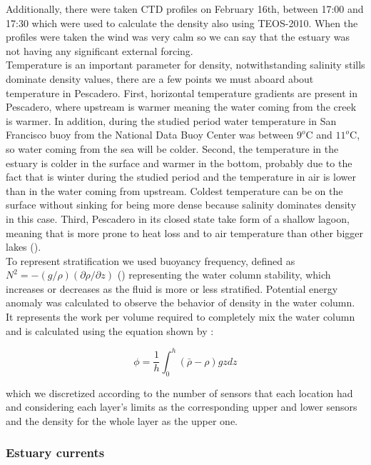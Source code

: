 \documentclass[11pt,letterpaper]{article}
\begin{document}
Additionally, there were taken CTD profiles on February 16th, between 17:00 and 17:30 which were used to calculate the density also using TEOS-2010. When the profiles were taken the wind was very calm so we can say that the estuary was not having any significant external forcing. \\

Temperature is an important parameter for density, notwithstanding salinity stills dominate density values, there are a few points we must aboard about temperature in Pescadero. First, horizontal temperature gradients are present in Pescadero, where upstream is warmer meaning the water coming from the creek is warmer. In addition, during the studied period water temperature in San Francisco buoy from the National Data Buoy Center was between $9^o$C and $11^o$C, so water coming from the sea will be colder. Second, the temperature in the estuary is colder in the surface and warmer in the bottom, probably due to the fact that is winter during the studied period and the temperature in air is lower than in the water coming from upstream. Coldest temperature can be on the surface without sinking for being more dense because salinity dominates density in this case. Third, Pescadero in its closed state take form of a shallow lagoon, meaning that is more prone to heat loss and to air temperature than other bigger lakes (\cite{peeters2009currents}).\\

To represent stratification we used buoyancy frequency, defined as $N^2 = -(g/\rho)(\partial \rho/\partial z)$ (\cite{kundu2002fluid}) representing the water column stability, which increases or decreases as the fluid is more or less stratified. Potential energy anomaly was calculated to observe the behavior of density in the water column. It represents the work per volume required to completely mix the water column and is calculated using the equation shown by \citeauthor{simpson1990tidal}: 

\begin{equation}
    \phi=\frac{1}{h}\int^h_0(\bar{\rho}-\rho)gzdz
    \label{eq: phi}
\end{equation}

which we discretized according to the number of sensors that each location had and considering each layer's limits as the corresponding upper and lower sensors and the density for the whole layer as the upper one. 

\subsubsection{Estuary currents}
\end{document}
